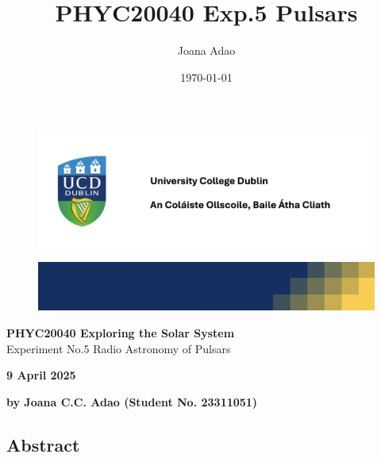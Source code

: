 \documentclass[12pt]{article}
\title{PHYC20040 Exp.5 Pulsars}
\author{Joana Adao}
\date{\today}
\begin{document}
\begin{titlepage}
    \begin{center}

        \begin{figure}[ht]
            \includegraphics[width=\textwidth]{UCDLogo.png}
        \end{figure}
        
        \begin{figure}
            \centerline{\includegraphics[width=\paperwidth]{UCDBanner.png}}
        \end{figure}

        \vspace{4cm}

        {\LARGE \bfseries PHYC20040 Exploring the Solar System}\\
        \vspace{0.75cm}
        {\Large Experiment No.5 Radio Astronomy of Pulsars}
        
        \vspace{1cm}
    
    {\Large \textbf{9 April 2025}}

    \vspace{2cm}
    
    {\large \textbf{by Joana C.C. Adao (Student No. 23311051)}}\\

    \end{center}

   \clearpage

\end{titlepage}

\begin{center}
    \section*{Abstract}
    \thispagestyle{empty}
\end{center}
\end{document}
